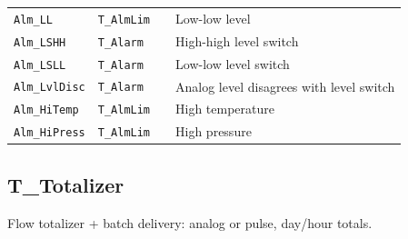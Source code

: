 \begin{small}
\begin{longtable}{@{}P{3.70cm}P{2.20cm}P{1.70cm}P{8.91cm}@{}}
\texttt{Alm\_LL} & \texttt{T\_AlmLim} &  & Low-low level \\
\texttt{Alm\_LSHH} & \texttt{T\_Alarm} &  & High-high level switch \\
\texttt{Alm\_LSLL} & \texttt{T\_Alarm} &  & Low-low level switch \\
\texttt{Alm\_LvlDisc} & \texttt{T\_Alarm} &  & Analog level disagrees with level switch \\
\texttt{Alm\_HiTemp} & \texttt{T\_AlmLim} &  & High temperature \\
\texttt{Alm\_HiPress} & \texttt{T\_AlmLim} &  & High pressure \\
\bottomrule
\end{longtable}
\end{small}

\subsection{T\_Totalizer}\label{sec:pclib-t-totalizer}

Flow totalizer + batch delivery: analog or pulse, day/\allowbreak{}hour totals.

\par{}\par

